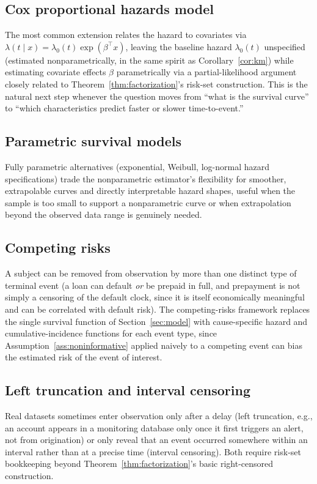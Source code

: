\documentclass[11pt]{article}
\theoremstyle{remark}
\theoremstyle{definition}
\begin{document}
\subsection{Cox proportional hazards model}
The most common extension relates the hazard to covariates via $\lambda(t\mid x)=\lambda_0(t)\exp(\beta^\top x)$, leaving the baseline hazard $\lambda_0(t)$ unspecified (estimated nonparametrically, in the same spirit as Corollary~\ref{cor:km}) while estimating covariate effects $\beta$ parametrically via a partial-likelihood argument closely related to Theorem~\ref{thm:factorization}'s risk-set construction. This is the natural next step whenever the question moves from ``what is the survival curve'' to ``which characteristics predict faster or slower time-to-event.''

\subsection{Parametric survival models}
Fully parametric alternatives (exponential, Weibull, log-normal hazard specifications) trade the nonparametric estimator's flexibility for smoother, extrapolable curves and directly interpretable hazard shapes, useful when the sample is too small to support a nonparametric curve or when extrapolation beyond the observed data range is genuinely needed.

\subsection{Competing risks}
A subject can be removed from observation by more than one distinct type of terminal event (a loan can default \emph{or} be prepaid in full, and prepayment is not simply a censoring of the default clock, since it is itself economically meaningful and can be correlated with default risk). The competing-risks framework replaces the single survival function of Section~\ref{sec:model} with cause-specific hazard and cumulative-incidence functions for each event type, since Assumption~\ref{ass:noninformative} applied naively to a competing event can bias the estimated risk of the event of interest.

\subsection{Left truncation and interval censoring}
Real datasets sometimes enter observation only after a delay (left truncation, e.g., an account appears in a monitoring database only once it first triggers an alert, not from origination) or only reveal that an event occurred somewhere within an interval rather than at a precise time (interval censoring). Both require risk-set bookkeeping beyond Theorem~\ref{thm:factorization}'s basic right-censored construction.
\end{document}
